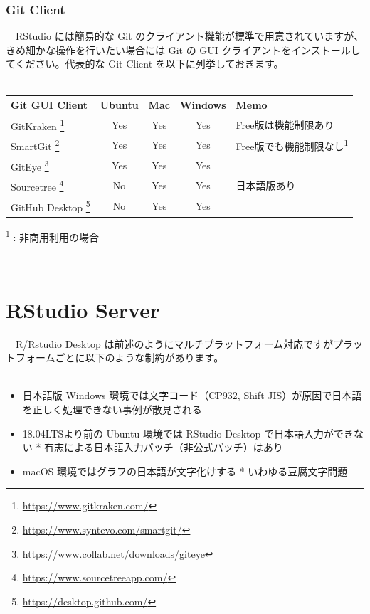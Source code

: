 \documentclass[
  12pt,
]{book}
\DeclareRobustCommand{\href}[2]{#2\footnote{\url{#1}}}
\providecommand{\tightlist}{%
  \setlength{\itemsep}{0pt}\setlength{\parskip}{0pt}}
\begin{document}
\hypertarget{git-client}{%
\subsection{Git Client}\label{git-client}}

　RStudio には簡易的な Git のクライアント機能が標準で用意されていますが、きめ細かな操作を行いたい場合には Git の GUI クライアントをインストールしてください。代表的な Git Client を以下に列挙しておきます。\\
　

\begin{longtable}[]{@{}lcccl@{}}
\toprule
Git GUI Client & Ubuntu & Mac & Windows & Memo \\
\midrule
\endhead
\href{https://www.gitkraken.com/}{GitKraken } & Yes & Yes & Yes & Free版は機能制限あり \\
\href{https://www.syntevo.com/smartgit/}{SmartGit } & Yes & Yes & Yes & Free版でも機能制限なし\textsuperscript{1} \\
\href{https://www.collab.net/downloads/giteye}{GitEye } & Yes & Yes & Yes & \\
\href{https://www.sourcetreeapp.com/}{Sourcetree } & No & Yes & Yes & 日本語版あり \\
\href{https://desktop.github.com/}{GitHub Desktop } & No & Yes & Yes & \\
\bottomrule
\end{longtable}

\textsuperscript{1} : 非商用利用の場合

　

\hypertarget{rstudio-server}{%
\chapter{RStudio Server}\label{rstudio-server}}

　R/Rstudio Desktop は前述のようにマルチプラットフォーム対応ですがプラットフォームごとに以下のような制約があります。\\
　

\begin{itemize}
\tightlist
\item
  日本語版 Windows 環境では文字コード（CP932, Shift JIS）が原因で日本語を正しく処理できない事例が散見される
\item
  18.04LTSより前の Ubuntu 環境では RStudio Desktop で日本語入力ができない * 有志による日本語入力パッチ（非公式パッチ）はあり
\item
  macOS 環境ではグラフの日本語が文字化けする * いわゆる豆腐文字問題
\end{itemize}
\end{document}
